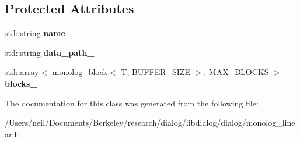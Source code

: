 \subsection*{Protected Attributes}
\begin{DoxyCompactItemize}
\item 
\mbox{\label{classdialog_1_1monolog_1_1monolog__linear__base_a65545bd6b412019ba9ca2031d596a26a}} 
std\+::string {\bfseries name\+\_\+}
\item 
\mbox{\label{classdialog_1_1monolog_1_1monolog__linear__base_ae5f8ae470de3c355febbaf1c793d9164}} 
std\+::string {\bfseries data\+\_\+path\+\_\+}
\item 
\mbox{\label{classdialog_1_1monolog_1_1monolog__linear__base_a53b03175e1a621804ce4b54ce0b5b049}} 
std\+::array$<$ \hyperlink{classdialog_1_1monolog_1_1monolog__block}{monolog\+\_\+block}$<$ T, B\+U\+F\+F\+E\+R\+\_\+\+S\+I\+ZE $>$, M\+A\+X\+\_\+\+B\+L\+O\+C\+KS $>$ {\bfseries blocks\+\_\+}
\end{DoxyCompactItemize}


The documentation for this class was generated from the following file\+:\begin{DoxyCompactItemize}
\item 
/\+Users/neil/\+Documents/\+Berkeley/research/dialog/libdialog/dialog/monolog\+\_\+linear.\+h\end{DoxyCompactItemize}
